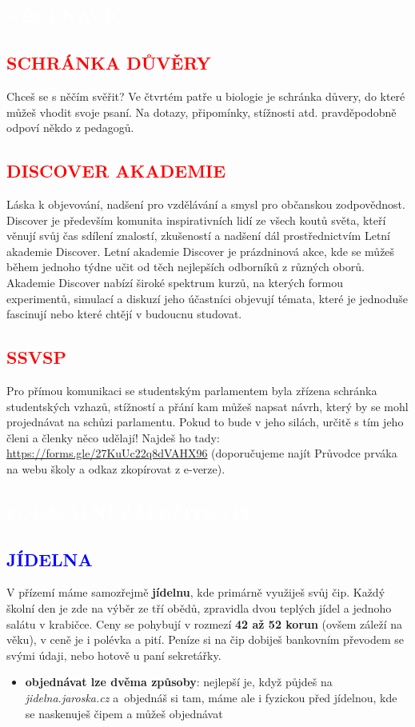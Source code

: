 \documentclass[a5paper, twoside]{article}
\newcommand{\nadpis}[4]{
  \vspace*{-50pt}
  \begin{tcolorbox}[colback = #2, boxrule = 0pt, grow to left by = #4,  grow to right by = #4, arc=8pt, height = 40pt]
    \vspace*{5pt}
    \centering \section*{\textcolor{#3}{#1}}
  \end{tcolorbox}
}
\newcommand{\podnadpis}[2]{
  \subsection*{\textcolor{#2}{#1}}
}
\begin{document}
\begin{minipage}{\linewidth}
\begin{minipage}{.26\linewidth}
{    \vfill}
  \end{minipage}
\end{minipage}

\nadpis{VĚCI NAVÍC}{red}{white}{-4.27cm}

\podnadpis{SCHRÁNKA DŮVĚRY}{red}
Chceš se s něčím svěřit? Ve čtvrtém patře u biologie je schránka důvery, do které můžeš vhodit svoje psaní. Na dotazy, připomínky, stížnosti atd. pravděpodobně odpoví někdo z pedagogů.

\podnadpis{DISCOVER AKADEMIE}{red}
Láska k objevování, nadšení pro vzdělávání a smysl pro občanskou zodpovědnost. Discover je především komunita inspirativních lidí ze všech koutů světa, kteří věnují svůj čas sdílení znalostí, zkušeností a nadšení dál prostřednictvím Letní akademie Discover. Letní akademie Discover je prázdninová akce, kde se můžeš během jednoho týdne učit od těch nejlepších odborníků z různých oborů. Akademie Discover nabízí široké spektrum kurzů, na kterých formou experimentů, simulací a diskuzí jeho účastníci objevují témata, které je jednoduše fascinují nebo které chtějí v budoucnu studovat.

\podnadpis{SSVSP}{red}
Pro přímou komunikaci se studentským parlamentem byla zřízena schránka studentských vzhazů, stížností a přání kam můžeš napsat návrh, který by se mohl projednávat na schůzi parlamentu. Pokud to bude v jeho silách, určitě s tím jeho členi a členky něco udělají! Najdeš ho tady: \url{https://forms.gle/27KuUc22q8dVAHX96} (doporučujeme najít {\Kapitan Průvodce prváka} na webu školy a odkaz zkopírovat z e-verze).

\newpage

\nadpis{FORMÁLNÍ ZÁLEŽITOSTI}{blue}{white}{-2.5cm}

\noindent \podnadpis{JÍDELNA}{blue}
V přízemí máme samozřejmě \textbf{jídelnu}, kde primárně využiješ svůj čip. Každý školní den je zde na výběr ze tří obědů, zpravidla dvou teplých jídel a jednoho salátu v krabičce. Ceny se pohybují v rozmezí \textbf{42 až 52 korun} (ovšem záleží na věku), v ceně je i polévka a pití. Peníze si na čip dobiješ bankovním převodem se svými údaji, nebo hotově u paní sekretářky.

\begin{itemize}[leftmargin=10pt]
	\item \textbf{objednávat lze dvěma způsoby}: nejlepší je, když půjdeš na \textit{jidelna.jaroska.cz} a~objednáš si tam, máme ale i fyzickou  před jídelnou, kde se naskenuješ čipem a můžeš objednávat
\end{itemize}
\end{document}
